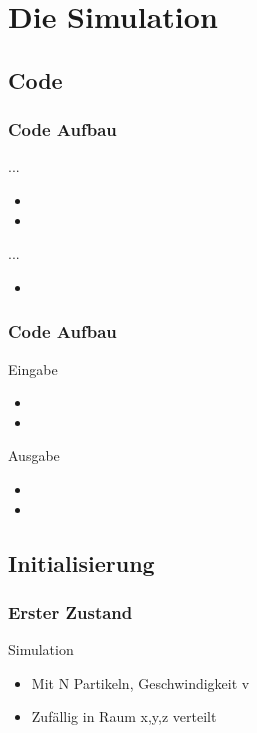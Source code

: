 \documentclass[11pt]{beamer}
\begin{document}
\section{Die Simulation}

\subsection{Code}

\begin{frame}
\frametitle{Code Aufbau}
  \vspace*{-0.3cm}
  \begin{block}{...}
  \begin{itemize}
      \item 
      \item 
    \end{itemize}
  \end{block}
  \pause
    \begin{block}{...}
  \begin{itemize}
      \item 
    \end{itemize}
  \end{block}
\end{frame}

\begin{frame}
\frametitle{Code Aufbau}
  \vspace*{-0.3cm}
  \begin{block}{Eingabe}
  \begin{itemize}
      \item 
      \item 
    \end{itemize}
  \end{block}
  \pause
    \begin{block}{Ausgabe}
  \begin{itemize}
      \item 
      \item 
    \end{itemize}
  \end{block}
\end{frame}

\subsection{Initialisierung}

\begin{frame}
\frametitle{Erster Zustand}
  \vspace*{-0.3cm}
  \begin{block}{Simulation}
    \begin{itemize}
      \item Mit N Partikeln, Geschwindigkeit v
      \item Zufällig in Raum x,y,z verteilt
    \end{itemize}
  \end{block}
\end{frame}
\end{document}
